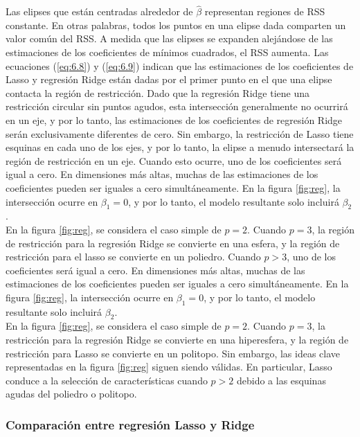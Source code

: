 Las elipses que están centradas alrededor de $\hat{\beta}$ representan regiones de RSS constante. En otras palabras, todos los puntos en una elipse dada comparten un valor común del RSS. A medida que las elipses se expanden alejándose de las estimaciones de los coeficientes de mínimos cuadrados, el RSS aumenta. Las ecuaciones (\ref{eq:6.8}) y (\ref{eq:6.9}) indican que las estimaciones de los coeficientes de Lasso y regresión Ridge están dadas por el primer punto en el que una elipse contacta la región de restricción. Dado que la regresión Ridge tiene una restricción circular sin puntos agudos, esta intersección generalmente no ocurrirá en un eje, y por lo tanto, las estimaciones de los coeficientes de regresión Ridge serán exclusivamente diferentes de cero. Sin embargo, la restricción de Lasso tiene esquinas en cada uno de los ejes, y por lo tanto, la elipse a menudo intersectará la región de restricción en un eje. Cuando esto ocurre, uno de los coeficientes será igual a cero. En dimensiones más altas, muchas de las estimaciones de los coeficientes pueden ser iguales a cero simultáneamente. En la figura \ref{fig:reg}, la intersección ocurre en $\beta_1 = 0$, y por lo tanto, el modelo resultante solo incluirá $\beta_2$. \\

En la figura \ref{fig:reg}, se considera el caso simple de $p = 2$. Cuando $p = 3$, la región de restricción para la regresión Ridge se convierte en una esfera, y la región de restricción para el lasso se convierte en un poliedro. Cuando $p > 3$, uno de los coeficientes será igual a cero. En dimensiones más altas, muchas de las estimaciones de los coeficientes pueden ser iguales a cero simultáneamente. En la figura \ref{fig:reg}, la intersección ocurre en $\beta_1 = 0$, y por lo tanto, el modelo resultante solo incluirá $\beta_2$. \\

En la figura \ref{fig:reg}, se considera el caso simple de $p = 2$. Cuando $p = 3$, la restricción para la regresión Ridge se convierte en una hiperesfera, y la región de restricción para Lasso se convierte en un politopo. Sin embargo, las ideas clave representadas en la figura \ref{fig:reg} siguen siendo válidas. En particular, Lasso conduce a la selección de características cuando $p > 2$ debido a las esquinas agudas del poliedro o politopo.

\subsubsection{Comparación entre regresión Lasso y Ridge}

